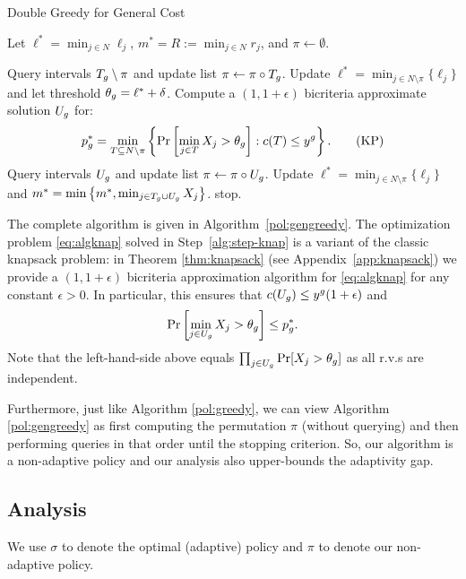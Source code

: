 \documentclass[11pt]{article}
\newcommand{\base}{y}
\theoremstyle{remark}
\theoremstyle{plain}
\theoremstyle{remark}
\begin{document}
\begin{algorithm} 
\label{alg:grd-gen}
\caption{Double Greedy for General Cost \label{pol:gengreedy}}
\begin{algorithmic}[1]
\State Let $\ell^* = \min_{j \in N} \ell_j$, $m^* = R:=\min_{j\in N} r_j$,  and $\pi\gets \emptyset$.
 

    \State \label{alg:step-a}  Query intervals $T_g\setminus \pi$ and update list $\pi \gets \pi \circ T_g$.
    \State \label{alg:step-theta} Update $\ell^* = \min_{j \in N \setminus \pi }\{\ell_j\}$ and   let threshold $\theta_g = \ell^* + \delta$. 
    \State \label{alg:step-knap} Compute a $(1,1+\epsilon)$ bicriteria approximate solution  $U_g$  for: 
    \begin{align}
    p^*_\i = \min_{T \subseteq N \setminus \pi } \left\{\Pr\left[ \min_{j \in T} X_j >  \theta_\i \right] : c(T) \leq {\base}^\i\right\}. \tag{KP}\label{eq:algknap}
    \end{align}
    \State \label{alg:step-b}  Query intervals $U_g$ and update list $\pi \gets \pi \circ  U_g$.
    \State Update $\ell^* = \min_{j \in N \setminus \pi }\{\ell_j\}$ and  $m^*=\min\left\{m^*, \min_{j\in T_g\cup U_g} X_j\right\}$. 
    stop. \EndIf
\EndFor
\end{algorithmic}
\end{algorithm}



The complete algorithm is given in Algorithm~\ref{pol:gengreedy}. 
The optimization problem \eqref{eq:algknap} solved in Step~\ref{alg:step-knap} is a variant of the classic knapsack problem: in Theorem \ref{thm:knapsack} (see Appendix~\ref{app:knapsack}) we provide a  $(1,1+\epsilon)$ bicriteria approximation algorithm for \eqref{eq:algknap} for any constant $\epsilon>0$. In particular, this ensures that $c(U_\i) \leq \base^\i(1+\epsilon)$ and 
$$ \Pr\left[\min_{j \in U_g} X_j  > \theta_g\right] \leq p^*_g .$$ Note that the left-hand-side above equals $\prod_{j \in U_g}\Pr[ X_j  > \theta_g]$ as all r.v.s are independent. 

Furthermore, just like Algorithm \ref{pol:greedy}, we can view   Algorithm \ref{pol:gengreedy} as first computing the permutation $\pi$ (without querying) and then performing  queries in that order until the stopping criterion. So, our algorithm is a non-adaptive policy and our analysis also upper-bounds the adaptivity gap. 
 
\subsection{Analysis}
 We use  $\sigma$ to denote the optimal (adaptive) policy and $\pi$ to denote our non-adaptive policy. 
 
\end{document}
